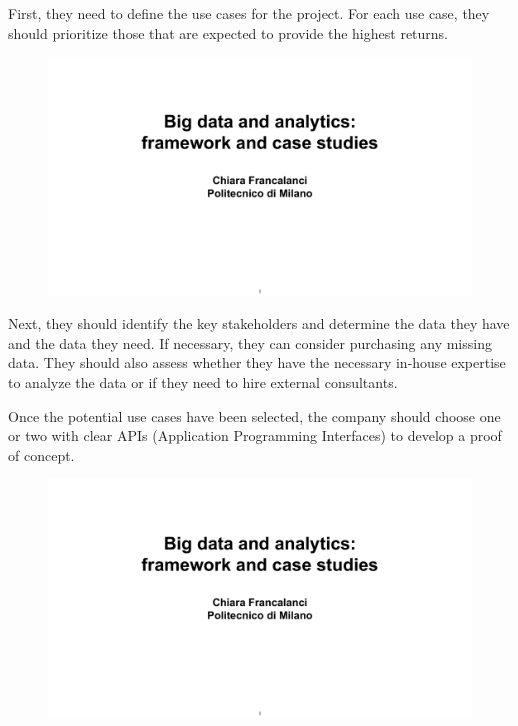 First, they need to define the use cases for the project. For each use
case, they should prioritize those that are expected to provide the
highest returns.

\begin{figure}[!h]
  \centering
  \includegraphics[page=85, trim = 1cm 1.5cm 1cm 4.5cm, clip, width=\imagewidth]{images/06 - BIG_DATA.pdf}
\end{figure}

Next, they should identify the key stakeholders and determine the data
they have and the data they need. If necessary, they can consider
purchasing any missing data. They should also assess whether they have
the necessary in-house expertise to analyze the data or if they need to
hire external consultants.

Once the potential use cases have been selected, the company should
choose one or two with clear APIs (Application Programming Interfaces)
to develop a proof of concept.

\begin{figure}[!h]
  \centering
  \includegraphics[page=86, trim = 1cm 1.5cm 1.5cm 3.5cm, clip, width=\imagewidth]{images/06 - BIG_DATA.pdf}
\end{figure}

